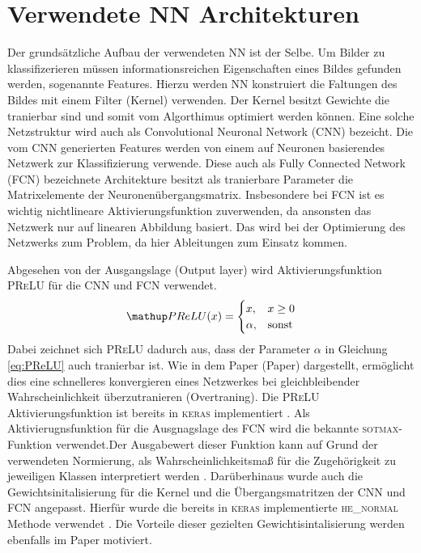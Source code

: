 \section{Verwendete NN Architekturen}\label{sec:NNarchitekturen}
Der grundsätzliche Aufbau der verwendeten NN ist der Selbe. Um Bilder zu
klassifizerieren müssen informationsreichen Eigenschaften eines Bildes
gefunden werden, sogenannte Features. Hierzu werden NN konstruiert die
Faltungen des Bildes mit einem Filter (Kernel) verwenden. Der Kernel besitzt
Gewichte die tranierbar sind und somit vom Algorthimus optimiert werden können.
Eine solche Netzstruktur wird auch als Convolutional Neuronal Network (CNN)
bezeicht. Die vom CNN generierten Features werden von einem auf Neuronen basierendes
Netzwerk zur Klassifizierung verwende. Diese auch als Fully Connected Network (FCN)
bezeichnete Architekture besitzt als tranierbare Parameter die Matrixelemente
der Neuronenübergangsmatrix. Insbesondere bei FCN ist es wichtig nichtlineare
Aktivierungsfunktion zuverwenden, da ansonsten das Netzwerk nur auf linearen
Abbildung basiert. Das wird bei der Optimierung des Netzwerks zum Problem, da
hier Ableitungen zum Einsatz kommen.

Abgesehen von der Ausgangslage (Output layer) wird Aktivierungsfunktion
\textsc{PReLU} für die CNN und FCN verwendet.
\begin{equation}
  \label{eq:PReLU}
  \map{PReLU}(x)= \begin{cases} x,      & x \ge 0\\
                                \alpha, & \mathrm{sonst}
                  \end{cases}
\end{equation}
Dabei zeichnet sich \textsc{PReLU} dadurch aus, dass der Parameter $\alpha$ in
Gleichung \eqref{eq:PReLU} auch tranierbar ist. Wie in dem Paper (Paper) \cite{he_normal_PReLU}
dargestellt, ermöglicht dies eine schnelleres konvergieren eines Netzwerkes
bei gleichbleibender Wahrscheinlichkeit überzutranieren (Overtraning).
Die \textsc{PReLU} Aktivierungsfunktion ist bereits in \textsc{keras}
implementiert \cite{keras_prelu}. Als Aktivierugnsfunktion für die Ausgnagslage
des FCN wird die bekannte \textsc{sotmax}-Funktion verwendet.Der Ausgabewert dieser
Funktion kann auf Grund der verwendeten Normierung, als Wahrscheinlichkeitsmaß
für die Zugehörigkeit zu jeweiligen Klassen interpretiert werden \cite[S. 139]{hands_on_machine_learning}.
Darüberhinaus wurde auch die Gewichtsinitalisierung für die Kernel und
die Übergangsmatritzen der CNN und FCN angepasst. Hierfür wurde die
bereits in \textsc{keras} implementierte \textsc{he\_normal} Methode
verwendet \cite{keras_he_normal}. Die Vorteile dieser gezielten
Gewichtisintalisierung werden ebenfalls im Paper \cite{he_normal_PReLU} motiviert.

